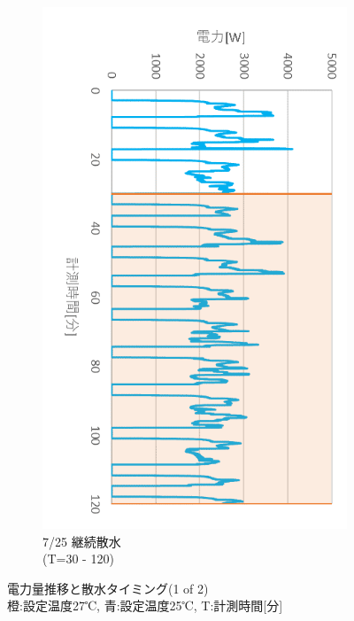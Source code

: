 \documentclass[a4j,fleqn,dvipdfmx,uplatex]{jsarticle}
\begin{document}
\begin{figure}[htb]
\begin{subfigure}[t]{0.32\linewidth}
      \includegraphics[width=\linewidth]{img/t_p/20220725.png}
      \caption{7/25 継続散水\\(T=30 - 120)}\label{fig:f}
  \end{subfigure}
  \caption{電力量推移と散水タイミング(1 of 2) \\ \small 橙:設定温度27℃, 青:設定温度25℃, T:計測時間[分]}\label{fig:ex_outputs_1/2}
\end{figure}
\end{document}
